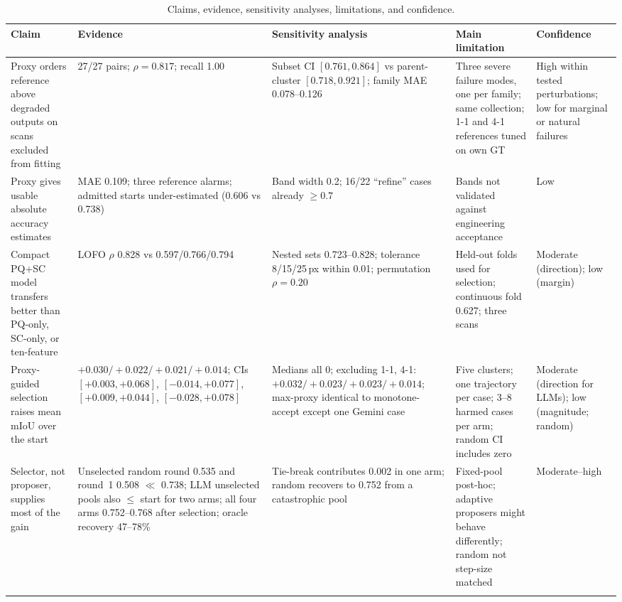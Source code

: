 \documentclass[a4paper,fleqn]{cas-dc}
\begin{document}
\begin{table}[t]
\caption{Claims, evidence, sensitivity analyses, limitations, and confidence.}\label{tab:evidence}
\centering
\footnotesize
\setlength{\tabcolsep}{3pt}
\begin{tabular}{L{0.18\textwidth} L{0.20\textwidth} L{0.21\textwidth} L{0.19\textwidth} L{0.14\textwidth}}
\toprule
Claim & Evidence & Sensitivity analysis & Main limitation & Confidence \\
\midrule
Proxy orders reference above degraded outputs on scans excluded from fitting &
27/27 pairs; $\rho=0.817$; recall 1.00 &
Subset CI $[0.761,0.864]$ vs parent-cluster $[0.718,0.921]$; family MAE 0.078--0.126 &
Three severe failure modes, one per family; same collection; 1-1 and 4-1 references tuned on own GT &
High within tested perturbations; low for marginal or natural failures \\
\addlinespace
Proxy gives usable absolute accuracy estimates &
MAE 0.109; three reference alarms; admitted starts under-estimated (0.606 vs 0.738) &
Band width 0.2; 16/22 ``refine'' cases already $\ge0.7$ &
Bands not validated against engineering acceptance &
Low \\
\addlinespace
Compact PQ+SC model transfers better than PQ-only, SC-only, or ten-feature &
LOFO $\rho$ 0.828 vs 0.597/0.766/0.794 &
Nested sets 0.723--0.828; tolerance 8/15/25\,px within 0.01; permutation $\rho=0.20$ &
Held-out folds used for selection; continuous fold 0.627; three scans &
Moderate (direction); low (margin) \\
\addlinespace
Proxy-guided selection raises mean mIoU over the start &
$+0.030/+0.022/+0.021/+0.014$; CIs $[+0.003,+0.068]$, $[-0.014,+0.077]$, $[+0.009,+0.044]$, $[-0.028,+0.078]$ &
Medians all 0; excluding 1-1, 4-1: $+0.032/+0.023/+0.023/+0.014$; max-proxy identical to monotone-accept except one Gemini case &
Five clusters; one trajectory per case; 3--8 harmed cases per arm; random CI includes zero &
Moderate (direction for LLMs); low (magnitude; random) \\
\addlinespace
Selector, not proposer, supplies most of the gain &
Unselected random round 0.535 and round~1 0.508 $\ll$ 0.738; LLM unselected pools also $\le$ start for two arms; all four arms 0.752--0.768 after selection; oracle recovery 47--78\% &
Tie-break contributes 0.002 in one arm; random recovers to 0.752 from a catastrophic pool &
Fixed-pool post-hoc; adaptive proposers might behave differently; random not step-size matched &
Moderate--high \\
\addlinespace

\end{tabular}
\end{table}
\end{document}

